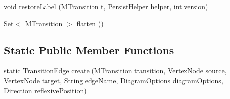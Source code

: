 \begin{DoxyCompactItemize}
\item 
void \hyperlink{classorg_1_1tzi_1_1use_1_1gui_1_1views_1_1diagrams_1_1statemachine_1_1_transition_edge_aa416c682fd99f20ad071207f31e16684}{restore\-Label} (\hyperlink{classorg_1_1tzi_1_1use_1_1uml_1_1mm_1_1statemachines_1_1_m_transition}{M\-Transition} t, \hyperlink{classorg_1_1tzi_1_1use_1_1gui_1_1util_1_1_persist_helper}{Persist\-Helper} helper, int version)
\item 
Set$<$ \hyperlink{classorg_1_1tzi_1_1use_1_1uml_1_1mm_1_1statemachines_1_1_m_transition}{M\-Transition} $>$ \hyperlink{classorg_1_1tzi_1_1use_1_1gui_1_1views_1_1diagrams_1_1statemachine_1_1_transition_edge_aed687a383af96b52b865f6cd72d4829a}{flatten} ()
\end{DoxyCompactItemize}
\subsection*{Static Public Member Functions}
\begin{DoxyCompactItemize}
\item 
static \hyperlink{classorg_1_1tzi_1_1use_1_1gui_1_1views_1_1diagrams_1_1statemachine_1_1_transition_edge}{Transition\-Edge} \hyperlink{classorg_1_1tzi_1_1use_1_1gui_1_1views_1_1diagrams_1_1statemachine_1_1_transition_edge_a8d662df6be6c19db53dabdda61055ca8}{create} (\hyperlink{classorg_1_1tzi_1_1use_1_1uml_1_1mm_1_1statemachines_1_1_m_transition}{M\-Transition} transition, \hyperlink{classorg_1_1tzi_1_1use_1_1gui_1_1views_1_1diagrams_1_1statemachine_1_1_vertex_node}{Vertex\-Node} source, \hyperlink{classorg_1_1tzi_1_1use_1_1gui_1_1views_1_1diagrams_1_1statemachine_1_1_vertex_node}{Vertex\-Node} target, String edge\-Name, \hyperlink{classorg_1_1tzi_1_1use_1_1gui_1_1views_1_1diagrams_1_1_diagram_options}{Diagram\-Options} diagram\-Options, \hyperlink{enumorg_1_1tzi_1_1use_1_1gui_1_1views_1_1diagrams_1_1util_1_1_direction}{Direction} \hyperlink{classorg_1_1tzi_1_1use_1_1gui_1_1views_1_1diagrams_1_1elements_1_1edges_1_1_edge_base_a3c4c59a344fe54ed87f8e637670930b5}{reflexive\-Position})
\end{DoxyCompactItemize}
